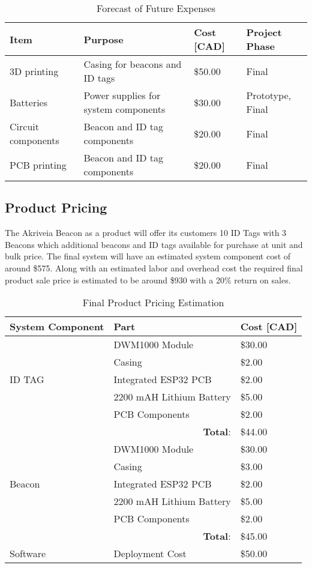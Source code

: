 \begin{table}[H]
\centering
\def\arraystretch{1.3}
\begin{tabular}{ | m{3.5cm} | m{6.25cm} | m{2.5cm} | m{3cm} |}
\hline
\textbf{Item} & \textbf{Purpose} & \textbf{Cost [CAD]} & \textbf{Project Phase}  \\
\hline
3D printing & Casing for beacons and ID tags & \$50.00 & Final  \\
\hline
Batteries & Power supplies for system components & \$30.00 & Prototype, Final \\
\hline
Circuit components & Beacon and ID tag components & \$20.00 & Final \\
\hline
PCB printing & Beacon and ID tag components & \$20.00 & Final \\
\hline
\end{tabular}
\caption{Forecast of Future Expenses}
\end{table}

\pagebreak
\subsection{Product Pricing}
\medskip
The Akriveia Beacon as a product will offer its customers 10 ID Tags with 3 Beacons which additional beacons and ID tags available for purchase at unit and bulk price. The final system will have an estimated system component cost of around \$575. Along with an estimated labor and overhead cost the required final product sale price is estimated to be around \$930 with a 20\% return on sales.


\begin{table}[H]
\centering
\def\arraystretch{1.5}
\begin{tabular}{ | m{5cm} | m{5cm} | m{5cm} |}
\hline
\textbf{System Component} & \textbf{Part} & \textbf{Cost [CAD]}  \\
\hline
\multirow{5}{*}{ID TAG} & DWM1000 Module & \$30.00 \\  \cline{2-3}
  					    & Casing & \$2.00 \\  \cline{2-3}
  					    & Integrated ESP32 PCB & \$2.00 \\  \cline{2-3}
  					    & 2200 mAH Lithium Battery & \$5.00 \\  \cline{2-3}
  					    & PCB Components & \$2.00 \\ 
\hline
\multicolumn{2}{|r|}{\textbf{Total}:} & \$44.00 \\
\hline
\multirow{5}{*}{Beacon} & DWM1000 Module & \$30.00 \\  \cline{2-3}
  					    & Casing & \$3.00 \\  \cline{2-3}
  					    & Integrated ESP32 PCB & \$2.00 \\  \cline{2-3}
  					    & 2200 mAH Lithium Battery & \$5.00 \\  \cline{2-3}
  					    & PCB Components & \$2.00 \\ 
\hline
\multicolumn{2}{|r|}{\textbf{Total}:} & \$45.00 \\
\hline
Software & Deployment Cost & \$50.00 \\
\hline
\end{tabular}
\caption{Final Product Pricing Estimation}
\end{table}

